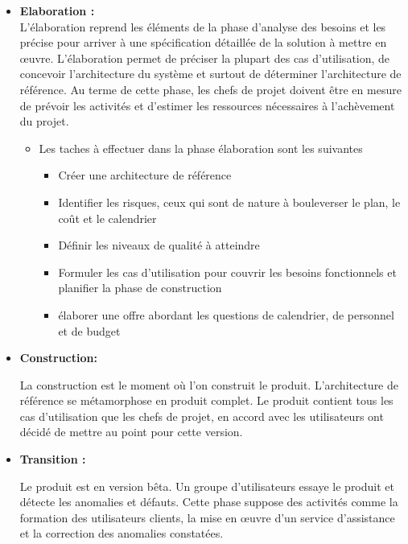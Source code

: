 \documentclass[12 pt]{report}
\begin{document}
\begin{itemize}[font=\color{black} \Large, label=]
\item \textbf{Elaboration :}
\\

L'élaboration reprend les éléments de la phase d'analyse des besoins et les précise pour arriver à une spécification détaillée de la solution à mettre en œuvre. L'élaboration permet de préciser la plupart des cas d’utilisation, de concevoir l’architecture du système et surtout de déterminer l'architecture de référence. Au terme de cette phase, les chefs de projet doivent être en mesure de prévoir les activités et d’estimer les ressources nécessaires à l’achèvement du projet.
\begin{itemize}[font=\color{black} \Large, label=]
\item Les taches à effectuer dans la phase élaboration sont les suivantes \begin{itemize}[font=\color{black} \Large, label=]
\item Créer une architecture de référence
\item Identifier les risques, ceux qui sont de nature à bouleverser le plan, le coût et le calendrier
\item Définir les niveaux de qualité à atteindre
\item Formuler les cas d'utilisation pour couvrir les besoins fonctionnels et planifier la phase de construction
\item élaborer une offre abordant les questions de calendrier, de personnel et de budget
\end{itemize}
\end{itemize}
\item \textbf{Construction:} 
\begin{flushleft}
La construction est le moment où l’on construit le produit. L’architecture de référence se métamorphose en produit complet. Le produit contient tous les cas d’utilisation que les chefs de projet, en accord avec les utilisateurs ont décidé de mettre au point pour cette version.
\end{flushleft}
\item \textbf{Transition :} 
\begin{flushleft}
Le produit est en version bêta. Un groupe d’utilisateurs essaye le produit et détecte les anomalies et défauts. Cette phase suppose des activités comme la formation des utilisateurs clients, la mise en œuvre d’un service d’assistance et la correction des anomalies constatées.
\end{flushleft}
\end{itemize}
\newpage
\end{document}
